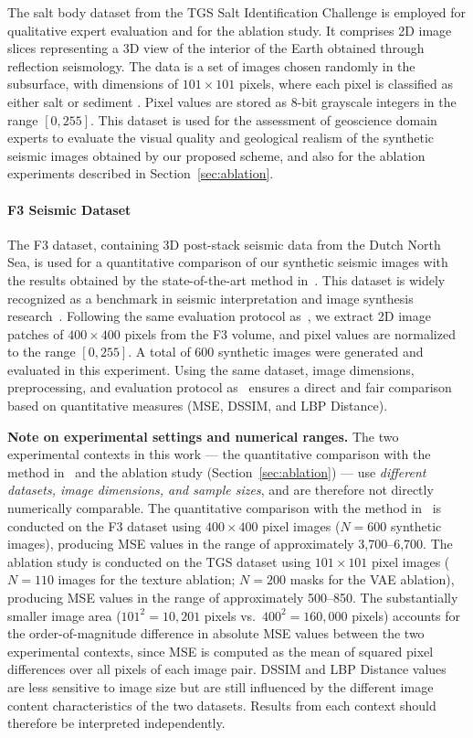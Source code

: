 \documentclass{ieeeaccess}
\begin{document}
The salt body dataset from the TGS Salt Identification Challenge is employed for qualitative expert evaluation and for the ablation study. It comprises 2D image slices representing a 3D view of the interior of the Earth obtained through reflection seismology. The data is a set of images chosen randomly in the subsurface, with dimensions of $101 \times 101$ pixels, where each pixel is classified as either salt or sediment \cite{TGS2023}. Pixel values are stored as 8-bit grayscale integers in the range $[0, 255]$. This dataset is used for the assessment of geoscience domain experts to evaluate the visual quality and geological realism of the synthetic seismic images obtained by our proposed scheme, and also for the ablation experiments described in Section~\ref{sec:ablation}.

\paragraph{F3 Seismic Dataset}

The F3 dataset, containing 3D post-stack seismic data from the Dutch North Sea, is used for a quantitative comparison of our synthetic seismic images with the results obtained by the state-of-the-art method in~\cite{Ferreira2020}. This dataset is widely recognized as a benchmark in seismic interpretation and image synthesis research~\cite{Baroni2018}. Following the same evaluation protocol as~\cite{Ferreira2020}, we extract 2D image patches of $400 \times 400$ pixels from the F3 volume, and pixel values are normalized to the range $[0, 255]$. A total of 600 synthetic images were generated and evaluated in this experiment. Using the same dataset, image dimensions, preprocessing, and evaluation protocol as~\cite{Ferreira2020} ensures a direct and fair comparison based on quantitative measures (MSE, DSSIM, and LBP Distance).

\noindent\textbf{Note on experimental settings and numerical ranges.} The two experimental contexts in this work --- the quantitative comparison with the method in~\cite{Ferreira2020} and the ablation study (Section~\ref{sec:ablation}) --- use \emph{different datasets, image dimensions, and sample sizes}, and are therefore not directly numerically comparable. The quantitative comparison with the method in~\cite{Ferreira2020} is conducted on the F3 dataset using $400 \times 400$ pixel images ($N = 600$ synthetic images), producing MSE values in the range of approximately 3,700--6,700. The ablation study is conducted on the TGS dataset using $101 \times 101$ pixel images ($N = 110$ images for the texture ablation; $N = 200$ masks for the VAE ablation), producing MSE values in the range of approximately 500--850. The substantially smaller image area ($101^2 = 10{,}201$ pixels vs.\ $400^2 = 160{,}000$ pixels) accounts for the order-of-magnitude difference in absolute MSE values between the two experimental contexts, since MSE is computed as the mean of squared pixel differences over all pixels of each image pair. DSSIM and LBP Distance values are less sensitive to image size but are still influenced by the different image content characteristics of the two datasets. Results from each context should therefore be interpreted independently.
\end{document}
